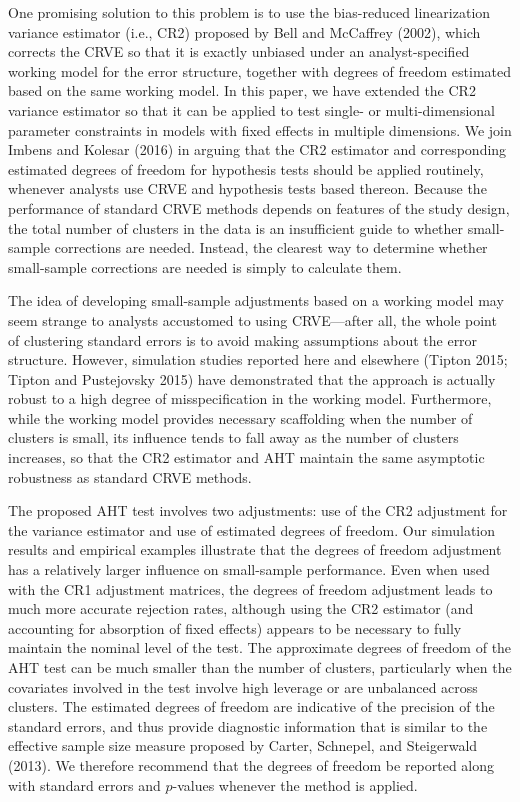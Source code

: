 \documentclass[12pt]{article}
\begin{document}
One promising solution to this problem is to use the bias-reduced
linearization variance estimator (i.e., CR2) proposed by Bell and
McCaffrey (2002), which corrects the CRVE so that it is exactly unbiased
under an analyst-specified working model for the error structure,
together with degrees of freedom estimated based on the same working
model. In this paper, we have extended the CR2 variance estimator so
that it can be applied to test single- or multi-dimensional parameter
constraints in models with fixed effects in multiple dimensions. We join
Imbens and Kolesar (2016) in arguing that the CR2 estimator and
corresponding estimated degrees of freedom for hypothesis tests should
be applied routinely, whenever analysts use CRVE and hypothesis tests
based thereon. Because the performance of standard CRVE methods depends
on features of the study design, the total number of clusters in the
data is an insufficient guide to whether small-sample corrections are
needed. Instead, the clearest way to determine whether small-sample
corrections are needed is simply to calculate them.

The idea of developing small-sample adjustments based on a working model
may seem strange to analysts accustomed to using CRVE---after all, the
whole point of clustering standard errors is to avoid making assumptions
about the error structure. However, simulation studies reported here and
elsewhere (Tipton 2015; Tipton and Pustejovsky 2015) have demonstrated
that the approach is actually robust to a high degree of
misspecification in the working model. Furthermore, while the working
model provides necessary scaffolding when the number of clusters is
small, its influence tends to fall away as the number of clusters
increases, so that the CR2 estimator and AHT maintain the same
asymptotic robustness as standard CRVE methods.

The proposed AHT test involves two adjustments: use of the CR2
adjustment for the variance estimator and use of estimated degrees of
freedom. Our simulation results and empirical examples illustrate that
the degrees of freedom adjustment has a relatively larger influence on
small-sample performance. Even when used with the CR1 adjustment
matrices, the degrees of freedom adjustment leads to much more accurate
rejection rates, although using the CR2 estimator (and accounting for
absorption of fixed effects) appears to be necessary to fully maintain
the nominal level of the test. The approximate degrees of freedom of the
AHT test can be much smaller than the number of clusters, particularly
when the covariates involved in the test involve high leverage or are
unbalanced across clusters. The estimated degrees of freedom are
indicative of the precision of the standard errors, and thus provide
diagnostic information that is similar to the effective sample size
measure proposed by Carter, Schnepel, and Steigerwald (2013). We
therefore recommend that the degrees of freedom be reported along with
standard errors and \(p\)-values whenever the method is applied.
\end{document}

